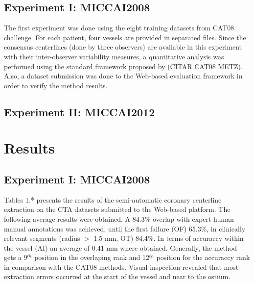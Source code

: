 \subsection{Experiment I: MICCAI2008}

The first experiment was done using the eight training datasets from CAT08 challenge. For each patient, four vessels are provided in separated files. Since the consensus centerlines (done by three observers) are available in this experiment with their inter-observer variability measures, a quantitative analysis was performed using the standard framework proposed by (CITAR CAT08 METZ). Also, a dataset submission was done to the Web-based evaluation framework in order to verify the method results.

\subsection{Experiment II: MICCAI2012}

\section{Results}

\subsection{Experiment I: MICCAI2008}

Tables 1.* presents the results of the semi-automatic coronary centerline extraction on the CTA datasets submitted to the Web-based platform. The following average results were obtained. A 84.3\% overlap with expert human manual annotations was achieved, until the first failure (OF) 65.3\%, in clinically relevant segments (radius $>$ 1.5 mm, OT) 84.4\%. In terms of accuraccy within the vessel (AI) an average of 0.41 mm where obtained. Generally, the method gets a 9$^{th}$ position in the overlaping rank and 12$^{th}$ position for the accuraccy rank in comparison with the CAT08 methods. Visual inspection revealed that most extraction errors occurred at the start of the vessel and near to the ostium.


